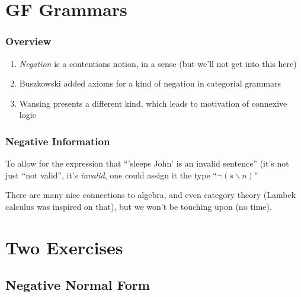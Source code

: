 \documentclass{beamer}
\begin{document}
\section{GF Grammars}


\begin{frame}

  

\end{frame}

\begin{frame}



\end{frame}



\begin{frame}[fragile]
\centering 

\end{frame}


\begin{frame}
  \frametitle{Overview}

\begin{enumerate}
\item \textit{Negation} is a contentions notion, in a sense (but we'll
  not get into this here)
\item Buszkowski added axioms for a kind of negation in categorial
  grammars
\item Wansing presents a different kind, which leads to motivation
  of connexive logic
\end{enumerate}
\end{frame}

\begin{frame}
  \frametitle{Negative Information}
  To allow for the expression that ``'sleeps John' is an invalid
  sentence'' (it's not just ``not valid'', it's \textit{invalid}, one could assign it the type ``$¬(s\backslash n)$''
  
  There are many nice connections to algebra, and even category theory (Lambek calculus was inspired on that), but we won't be touching upon (no time).
  
\end{frame}
  

\section{Two Exercises}
\subsection{Negative Normal Form}
\end{document}
